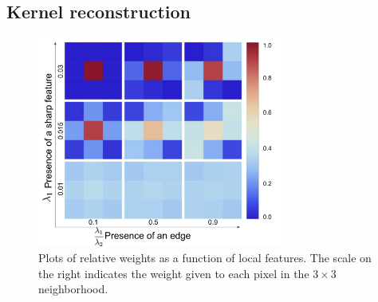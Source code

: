 \documentclass{sig-alternate}
\begin{document}






\subsection{Kernel reconstruction}
\label{sec:kernelReconstruction}

\begin{figure}
\centering
\includegraphics[width=19pc]{figures/Wronski2019-figure-8.pdf}
\caption{Plots of relative weights as a function of local features. The scale on the right indicates the weight given to each pixel in the $3\times 3$ neighborhood.~\cite{Wronski2019}}
\label{fig:Wronski2019Fig8}
\end{figure}
\end{document}
